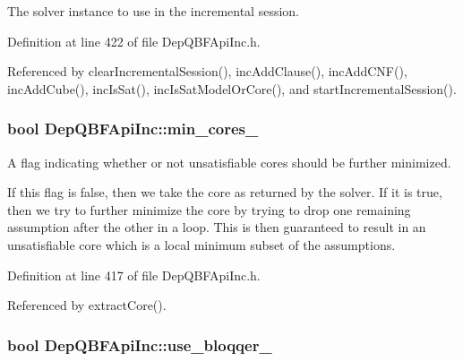 The solver instance to use in the incremental session. 



Definition at line 422 of file Dep\-Q\-B\-F\-Api\-Inc.\-h.



Referenced by clear\-Incremental\-Session(), inc\-Add\-Clause(), inc\-Add\-C\-N\-F(), inc\-Add\-Cube(), inc\-Is\-Sat(), inc\-Is\-Sat\-Model\-Or\-Core(), and start\-Incremental\-Session().

\hypertarget{classDepQBFApiInc_a973cfad8d1464ceab22eab182332fe20}{
\subsubsection[{min\-\_\-cores\-\_\-}]{\setlength{\rightskip}{0pt plus 5cm}bool Dep\-Q\-B\-F\-Api\-Inc\-::min\-\_\-cores\-\_\-\hspace{0.3cm}{\ttfamily [protected]}}}\label{classDepQBFApiInc_a973cfad8d1464ceab22eab182332fe20}


A flag indicating whether or not unsatisfiable cores should be further minimized. 

If this flag is false, then we take the core as returned by the solver. If it is true, then we try to further minimize the core by trying to drop one remaining assumption after the other in a loop. This is then guaranteed to result in an unsatisfiable core which is a local minimum subset of the assumptions. 

Definition at line 417 of file Dep\-Q\-B\-F\-Api\-Inc.\-h.



Referenced by extract\-Core().

\hypertarget{classDepQBFApiInc_af02ebc9cd6d44dabef38211a0aa382e6}{
\subsubsection[{use\-\_\-bloqqer\-\_\-}]{\setlength{\rightskip}{0pt plus 5cm}bool Dep\-Q\-B\-F\-Api\-Inc\-::use\-\_\-bloqqer\-\_\-\hspace{0.3cm}{\ttfamily [protected]}}}\label{classDepQBFApiInc_af02ebc9cd6d44dabef38211a0aa382e6}


